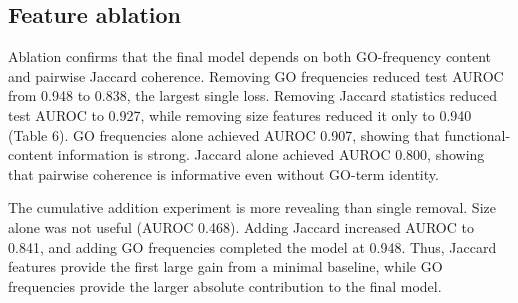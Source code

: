 \documentclass[11pt]{article}
\begin{document}
\subsection{Feature ablation}
Ablation confirms that the final model depends on both GO-frequency content and pairwise Jaccard coherence. Removing GO frequencies reduced test AUROC from 0.948 to 0.838, the largest single loss. Removing Jaccard statistics reduced test AUROC to 0.927, while removing size features reduced it only to 0.940 (Table 6). GO frequencies alone achieved AUROC 0.907, showing that functional-content information is strong. Jaccard alone achieved AUROC 0.800, showing that pairwise coherence is informative even without GO-term identity.

The cumulative addition experiment is more revealing than single removal. Size alone was not useful (AUROC 0.468). Adding Jaccard increased AUROC to 0.841, and adding GO frequencies completed the model at 0.948. Thus, Jaccard features provide the first large gain from a minimal baseline, while GO frequencies provide the larger absolute contribution to the final model.

\begin{table}[H]
\centering
\caption{Feature ablation and cumulative addition in the seed-42 run.}
\label{tab:6}
\scriptsize
{}
\end{table}
\end{document}
